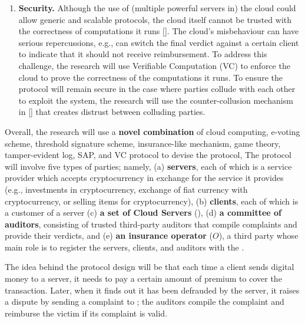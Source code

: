 \begin{enumerate}
 \item \textbf{Security.} Although the use of (multiple powerful servers in) the cloud could allow generic and scalable protocols, the cloud itself cannot be trusted with the correctness of computations it runs \href{https://stax.strath.ac.uk/concern/theses/qr46r085k}{[\printcntr]}. The cloud's misbehaviour can have serious repercussions, e.g., can switch the final verdict against a certain client to indicate that it should not receive reimbursement. To address this challenge, the research will use Verifiable Computation (VC) to enforce the cloud to prove the correctness of the computations it runs. To ensure the protocol will remain secure in the case where parties collude with each other to exploit the system, the research will use the counter-collusion mechanism in \href{https://dl.acm.org/doi/10.1145/3133956.3134032}{[\printcntr]} that creates distrust between colluding parties. 
\end{enumerate}
\vspace{-2mm}

Overall, the research will use a \textbf{novel combination} of cloud computing, e-voting scheme, threshold signature scheme, insurance-like mechanism, game theory, tamper-evident log, SAP, and VC protocol to devise the protocol, 
%
The protocol will involve five types of parties; namely, (a) \textbf{servers}, each of which is a service provider which accepts cryptocurrency in exchange for the service it provides (e.g., investments in cryptocurrency,  exchange of fiat currency with cryptocurrency, or selling items for cryptocurrency), (b) \textbf{clients}, each of which is a customer of a server (c) \textbf{a set of Cloud Servers} (\cs), (d) \textbf{a committee of auditors}, consisting of trusted third-party auditors that compile complaints and provide their verdicts, and (e) \textbf{an insurance operator} ($O$), a third party whose main role is to register the servers, clients, and auditors with the \cs. 

The idea behind the protocol design will be that each time a client sends digital money to a server, it needs to pay a certain amount of premium to cover the transaction. Later, when it finds out it has been defrauded by the server, it raises a dispute by sending a complaint to \cs; the auditors compile the complaint and reimburse the victim if its complaint is valid.





%



